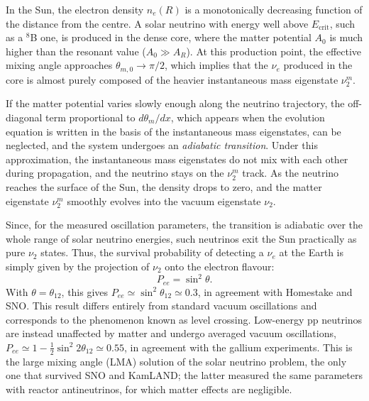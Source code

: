 In the Sun, the electron density $n_e(R)$ is a monotonically decreasing function of the distance from the centre. A solar neutrino with energy well above $E_\text{crit}$, such as a ${}^{8}$B one, is produced in the dense core, where the matter potential $A_0$ is much higher than the resonant value ($A_0 \gg A_R$). At this production point, the effective mixing angle approaches $\theta_{m,0} \to \pi/2$, which implies that the $\nu_e$ produced in the core is almost purely composed of the heavier instantaneous mass eigenstate $\nu_2^m$.

If the matter potential varies slowly enough along the neutrino trajectory, the off-diagonal term proportional to $d\theta_m/dx$, which appears when the evolution equation is written in the basis of the instantaneous mass eigenstates, can be neglected, and the system undergoes an \textit{adiabatic transition}. Under this approximation, the instantaneous mass eigenstates do not mix with each other during propagation, and the neutrino stays on the $\nu_2^m$ track. As the neutrino reaches the surface of the Sun, the density drops to zero, and the matter eigenstate $\nu_2^m$ smoothly evolves into the vacuum eigenstate $\nu_2$.

Since, for the measured oscillation parameters, the transition is adiabatic over the whole range of solar neutrino energies, such neutrinos exit the Sun practically as pure $\nu_2$ states. Thus, the survival probability of detecting a $\nu_e$ at the Earth is simply given by the projection of $\nu_2$ onto the electron flavour:
\begin{equation}
    \label{eq:adiabatic_survival_prob}
    P_{ee} = \sin^2 \theta.
\end{equation}
With $\theta = \theta_{12}$, this gives $P_{ee} \simeq \sin^2\theta_{12} \simeq 0.3$, in agreement with Homestake and SNO. This result differs entirely from standard vacuum oscillations and corresponds to the phenomenon known as level crossing. Low-energy \ac{pp} neutrinos are instead unaffected by matter and undergo averaged vacuum oscillations, $P_{ee} \simeq 1 - \tfrac{1}{2}\sin^2 2\theta_{12} \simeq 0.55$, in agreement with the gallium experiments. This is the large mixing angle (LMA) solution of the solar neutrino problem, the only one that survived SNO and KamLAND; the latter measured the same parameters with reactor antineutrinos, for which matter effects are negligible.



